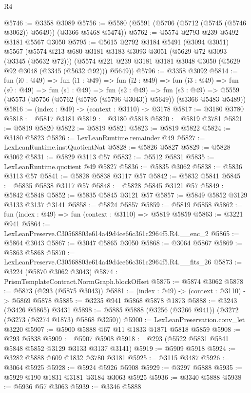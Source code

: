 \begin{lexlean}{R4}
\begin{coremodule}
@5746 := @3358 @3089
@5756 := @5580 (@5591 (@5706 (@5712 (@5745 (@5746 @3062)) @5649)) (@3366 @5468 @5474))
@5762 := @5574 @2793 @239 @5492 @3181 @5567 @3050
@5795 := @5615
    @2792
    @3184
    @5491
    (@3094 @3051)
    @5567
    (@5574
      @213
      @680
      @3181
      @3183
      @3093
      @3051
      (@5629 @72 @3093 (@3345 (@5632 @72)))
      (@5574 @221 @239 @3181 @3181 @3048 @3050 (@5629 @92 @3048 (@3345 (@5632 @92))) @5649))
@5796 := @3358 @3092
@5814 := fun (i0 : @49) =>
  fun (i1 : @49) =>
  fun (i2 : @49) =>
  fun (i3 : @49) =>
  fun (s0 : @49) =>
  fun (s1 : @49) =>
  fun (s2 : @49) =>
  fun (s3 : @49) => @5559 (@5573 (@5756 (@5762 (@5795 (@5796 @3043)) @5649)) (@3366 @5483 @5489))
@5816 := (index : @49) -> (context : @3110) -> @3178
@5817 := @3180 @3780
@5818 := @5817 @3181
@5819 := @3180 @5818
@5820 := @5819 @3781
@5821 := @5819 @5820
@5822 := @5819 @5821
@5823 := @5819 @5822
@5824 := @3180 @5823
@5826 := LexLeanRuntime.remainder @49
@5827 := LexLeanRuntime.instQuotientNat
@5828 := @5826 @5827
@5829 := @5828 @3062
@5831 := @5829 @3113 @57
@5832 := @5512 @5831
@5835 := LexLeanRuntime.quotient @49 @5827
@5836 := @5835 @3062
@5838 := @5836 @3113 @57
@5841 := @5828 @5838 @3117 @57
@5842 := @5832 @5841
@5845 := @5835 @5838 @3117 @57
@5848 := @5828 @5845 @3121 @57
@5849 := @5842 @5848
@5852 := @5835 @5845 @3121 @57
@5857 := @5849 @5852 @3129 @3133 @3137 @3141
@5858 := @5824 @5857
@5859 := @5819 @5858
@5862 := fun (index : @49) => fun (context : @3110) => @5819 @5859
@5863 := @3221 @941
@5864 := LexLeanPreserve.C30568803e614a49d4ce66c361c2964f5.R4.__enc_2
@5865 := @5864 @3043
@5867 := @3047 @5865 @3050
@5868 := @3064 @5867
@5869 := @5863 @5868
@5870 := LexLeanPreserve.C30568803e614a49d4ce66c361c2964f5.R4.__fits_26
@5873 := @3224 (@5870 @3062 @3043)
@5874 := PrismTemplateContract.NormGraph.blockOffset
@5875 := @5874 @3062
@5878 := @5873 (@293 (@5875 @3043))
@5881 := (index : @49) -> (context : @3110) -> @5869 @5878
@5885 := @3235 @941 @5868 @5878 @1873
@5888 := @3243 (@3426 @5865) @3431
@5898 := @5885 @5888 (@3256 (@3266 @941)) (@3272 (@3273 (@3274 @1873) @5868 @3250))
@5900 := LexLeanPreservation.conv_let @3220
@5907 := @5900 @5888 @67 @11 @1833 @1871 @5818 @5859
@5908 := @293 @5838
@5909 := @5907 @5908
@5918 := @293 (@5522 @5831 @5841 @5848 @5852 @3129 @3133 @3137 @3141)
@5919 := @5909 @5918
@5924 := @3282 @5888 @609 @1832 @3780 @3181
@5925 := @3115 @3487
@5926 := @3064 @5925
@5928 := @5924 @5926 @5908
@5929 := @3297 @5888
@5935 := @5929 @190 @1831 @3181 @3184 @3063 @5925
@5936 := @3340 @5888
@5938 := @5936 @57 @3063
@5939 := @3346 @5888

\end{coremodule}
\end{lexlean}
